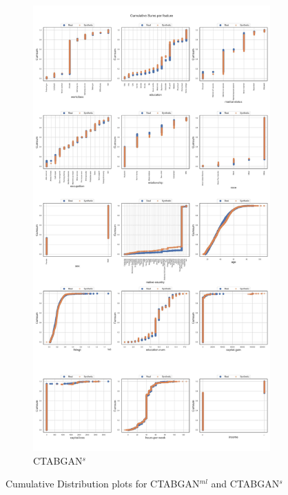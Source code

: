 \begin{landscape}
\begin{figure}[h]
		\hfill
		\begin{subfigure}{0.45\linewidth}
			\includegraphics[height=\textheight,width=\linewidth,keepaspectratio]{images/cumsums/ctabgan_simTune.jpg}
			\caption{CTABGAN$^s$}
		\end{subfigure}	
		\hfill
		\caption[Cumulative Distribution plots CTABGAN Models]{Cumulative Distribution plots for CTABGAN$^{ml}$ and CTABGAN$^s$}
		\label{fig_a:cumsum_1}
	\end{figure}
\end{landscape}
